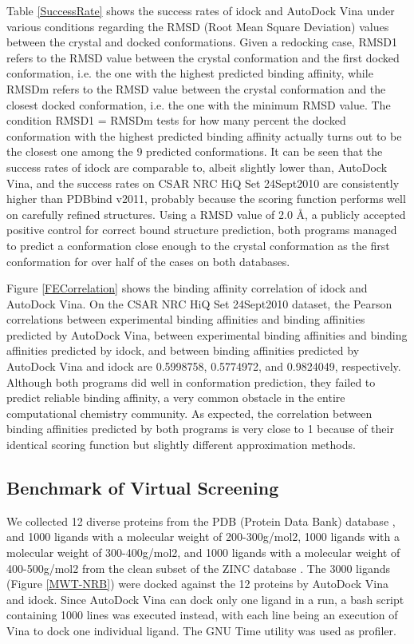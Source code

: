 \documentclass[12pt]{article}
\begin{document}
Table \ref{SuccessRate} shows the success rates of idock and AutoDock Vina under various conditions regarding the RMSD (Root Mean Square Deviation) values between the crystal and docked conformations. Given a redocking case, RMSD1 refers to the RMSD value between the crystal conformation and the first docked conformation, i.e. the one with the highest predicted binding affinity, while RMSDm refers to the RMSD value between the crystal conformation and the closest docked conformation, i.e. the one with the minimum RMSD value. The condition RMSD1 = RMSDm tests for how many percent the docked conformation with the highest predicted binding affinity actually turns out to be the closest one among the 9 predicted conformations. It can be seen that the success rates of idock are comparable to, albeit slightly lower than, AutoDock Vina, and the success rates on CSAR NRC HiQ Set 24Sept2010 are consistently higher than PDBbind v2011, probably because the scoring function performs well on carefully refined structures. Using a RMSD value of 2.0 \AA, a publicly accepted positive control for correct bound structure prediction, both programs managed to predict a conformation close enough to the crystal conformation as the first conformation for over half of the cases on both databases.

Figure \ref{FECorrelation} shows the binding affinity correlation of idock and AutoDock Vina. On the CSAR NRC HiQ Set 24Sept2010 dataset, the Pearson correlations between experimental binding affinities and binding affinities predicted by AutoDock Vina, between experimental binding affinities and binding affinities predicted by idock, and between binding affinities predicted by AutoDock Vina and idock are 0.5998758, 0.5774972, and 0.9824049, respectively. Although both programs did well in conformation prediction, they failed to predict reliable binding affinity, a very common obstacle in the entire computational chemistry community. As expected, the correlation between binding affinities predicted by both programs is very close to 1 because of their identical scoring function but slightly different approximation methods.

\subsection*{\sffamily \large Benchmark of Virtual Screening}

We collected 12 diverse proteins from the PDB (Protein Data Bank) database \cite{540,537}, and 1000 ligands with a molecular weight of 200-300g/mol2, 1000 ligands with a molecular weight of 300-400g/mol2, and 1000 ligands with a molecular weight of 400-500g/mol2 from the clean subset of the ZINC database \cite{532,1178}. The 3000 ligands (Figure \ref{MWT-NRB}) were docked against the 12 proteins by AutoDock Vina and idock. Since AutoDock Vina can dock only one ligand in a run, a bash script containing 1000 lines was executed instead, with each line being an execution of Vina to dock one individual ligand. The GNU Time utility was used as profiler.
\end{document}
